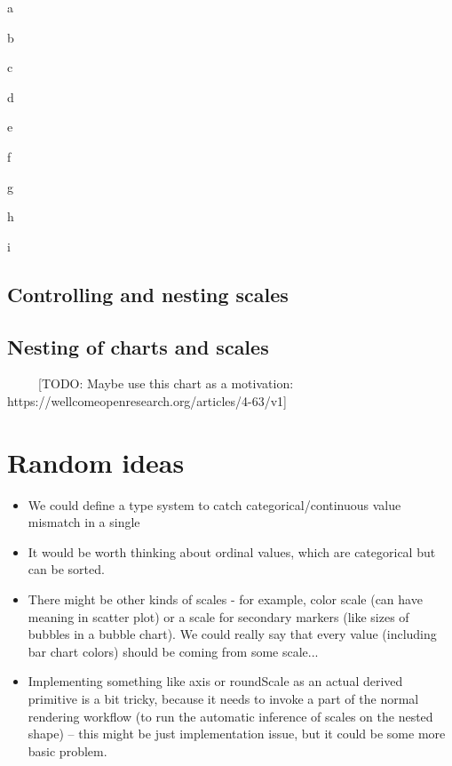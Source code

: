 \documentclass{jfp}
\newcommand{\kvd}[1]{\textnormal{\textcolor{kvdclr}{\sffamily #1}}}
\begin{document}
a

b

c

d

e

f

g

h

i
\newpage


\subsection*{Controlling and nesting scales}


\subsection*{Nesting of charts and scales}

~
~
~
[TODO: Maybe use this chart as a motivation: https://wellcomeopenresearch.org/articles/4-63/v1]
~
\section{Random ideas}
\begin{itemize}
\item We could define a type system to catch categorical/continuous value mismatch in a single %
\item It would be worth thinking about ordinal values, which are categorical but can be sorted.
\item There might be other kinds of scales - for example, color scale (can have meaning in scatter plot)
 or a scale for secondary markers (like sizes of bubbles in a bubble chart). We could really say that
 every value (including bar chart colors) should be coming from some scale...
\item Implementing something like \kvd{axis} or \kvd{roundScale} as an actual derived primitive is
 a bit tricky, because it needs to invoke a part of the normal rendering workflow (to run the
 automatic inference of scales on the nested shape) -- this might be just implementation issue,
 but it could be some more basic problem.
\end{itemize}
\end{document}
